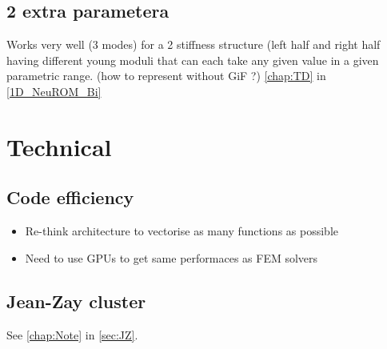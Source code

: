 \subsection{2 extra parametera}

Works very well (3 modes) for a 2 stiffness structure (left half and right half having different young moduli that can each take any given value in a given parametric range. (how to represent without GiF ?) \cref{chap:TD} in \cref{1D_NeuROM_Bi}
\section{Technical}

\subsection{Code efficiency}

\begin{itemize}
    \item Re-think architecture to vectorise as many functions as possible
    \item Need to use GPUs to get same performaces as FEM solvers \parencite{park_convolution_2023}
\end{itemize}

\subsection{Jean-Zay cluster}

See \cref{chap:Note} in \cref{sec:JZ}.

